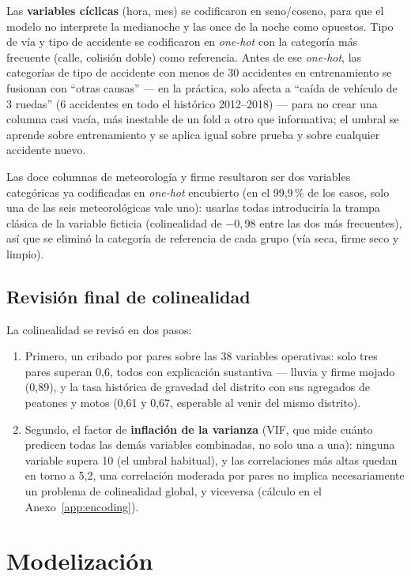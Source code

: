 \documentclass[11pt,a4paper]{article}
\begin{document}
Las \textbf{variables cíclicas} (hora, mes) se codificaron en seno/coseno, para que el modelo no interprete la medianoche y las once de la noche como opuestos. Tipo de vía y tipo de accidente se codificaron en \emph{one-hot} con la categoría más frecuente (calle, colisión doble) como referencia. Antes de ese \emph{one-hot}, las categorías de tipo de accidente con menos de 30 accidentes en entrenamiento se fusionan con ``otras causas'' --- en la práctica, solo afecta a ``caída de vehículo de 3 ruedas'' (6 accidentes en todo el histórico 2012--2018) --- para no crear una columna casi vacía, más inestable de un fold a otro que informativa; el umbral se aprende sobre entrenamiento y se aplica igual sobre prueba y sobre cualquier accidente nuevo.

Las doce columnas de meteorología y firme resultaron ser dos variables categóricas ya codificadas en \emph{one-hot} encubierto (en el 99,9\,\% de los casos, solo una de las seis meteorológicas vale uno): usarlas todas introduciría la trampa clásica de la variable ficticia (colinealidad de $-0{,}98$ entre las dos más frecuentes), así que se eliminó la categoría de referencia de cada grupo (vía seca, firme seco y limpio).

\subsection{Revisión final de colinealidad}

La colinealidad se revisó en dos pasos:
\begin{enumerate}[nosep]
\item Primero, un cribado por pares sobre las 38 variables operativas: solo tres pares superan 0,6, todos con explicación sustantiva --- lluvia y firme mojado (0,89), y la tasa histórica de gravedad del distrito con sus agregados de peatones y motos (0,61 y 0,67, esperable al venir del mismo distrito).
\item  Segundo, el factor de \textbf{inflación de la varianza} (VIF, que mide cuánto predicen todas las demás variables combinadas, no solo una a una): ninguna variable supera 10 (el umbral habitual), y las correlaciones más altas quedan en torno a 5,2, una correlación moderada por pares no implica necesariamente un problema de colinealidad global, y viceversa (cálculo en el Anexo~\ref{app:encoding}).
\end{enumerate}


\section{Modelización}
\end{document}

